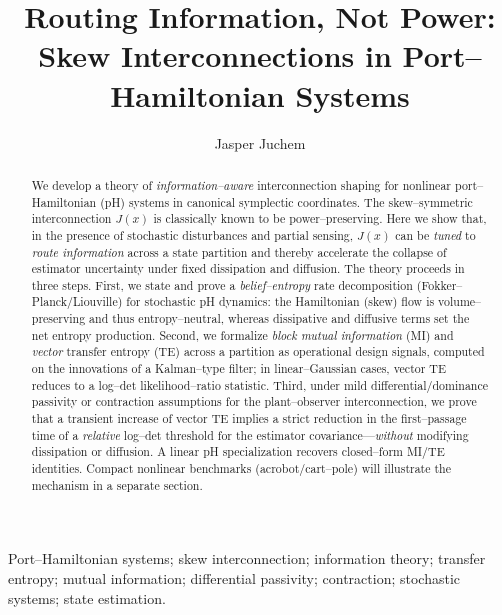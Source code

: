 \documentclass[final,5p,times,twocolumn]{elsarticle}
\begin{document}
	
	\begin{frontmatter}
		
		\title{Routing Information, Not Power: Skew Interconnections in Port--Hamiltonian Systems} %
		
		
		\author[]{Jasper Juchem}
		\address{<Your Department and Institution>}
		
		\begin{abstract}
			We develop a theory of \emph{information--aware} interconnection shaping for nonlinear port--Hamiltonian (pH) systems in canonical symplectic coordinates. The skew--symmetric interconnection \(J(x)\) is classically known to be power--preserving. Here we show that, in the presence of stochastic disturbances and partial sensing, \(J(x)\) can be \emph{tuned} to \emph{route information} across a state partition and thereby accelerate the collapse of estimator uncertainty under fixed dissipation and diffusion. The theory proceeds in three steps. First, we state and prove a \emph{belief--entropy} rate decomposition (Fokker--Planck/Liouville) for stochastic pH dynamics: the Hamiltonian (skew) flow is volume--preserving and thus entropy--neutral, whereas dissipative and diffusive terms set the net entropy production. Second, we formalize \emph{block mutual information} (MI) and \emph{vector} transfer entropy (TE) across a partition as operational design signals, computed on the innovations of a Kalman--type filter; in linear--Gaussian cases, vector TE reduces to a log--det likelihood--ratio statistic. Third, under mild differential/dominance passivity or contraction assumptions for the plant--observer interconnection, we prove that a transient increase of vector TE implies a strict reduction in the first--passage time of a \emph{relative} log--det threshold for the estimator covariance---\emph{without} modifying dissipation or diffusion. A linear pH specialization recovers closed--form MI/TE identities. Compact nonlinear benchmarks (acrobot/cart--pole) will illustrate the mechanism in a separate section.
		\end{abstract}
		
		\begin{keyword}
			Port--Hamiltonian systems; skew interconnection; information theory; transfer entropy; mutual information; differential passivity; contraction; stochastic systems; state estimation.
		\end{keyword}
		
	\end{frontmatter}
	
\end{document}
